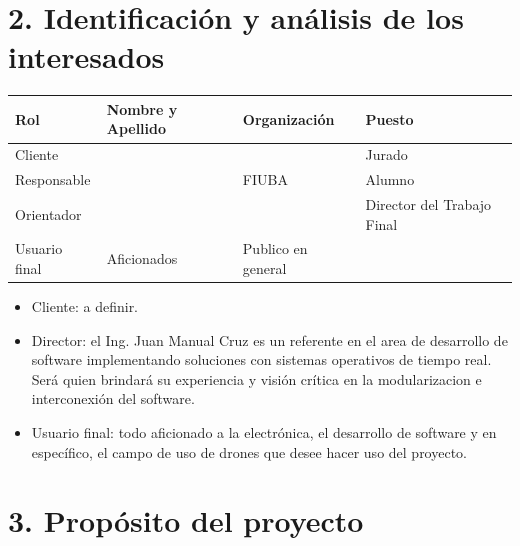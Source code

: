 \documentclass[
11pt, %
]{charter}
\begin{document}
	\vspace{25px}



\section{2. Identificación y análisis de los interesados}
\label{sec:interesados}



	\begin{table}[ht]
		\begin{tabularx}{\linewidth}{@{}|l|X|X|l|@{}}
			\hline
			\rowcolor[HTML]{C0C0C0}
			Rol           & Nombre y Apellido & Organización       & Puesto                     \\ \hline
			Cliente       & \clientename      & \empclientename    & Jurado                     \\ \hline
			Responsable   & \authorname       & FIUBA              & Alumno                     \\ \hline
			Orientador    & \supname          & \pertesupname      & Director del Trabajo Final \\ \hline
			Usuario final & Aficionados       & Publico en general &                            \\ \hline
		\end{tabularx}
	\end{table}

	\begin{itemize}
		\item Cliente: a definir.
		\item Director: el Ing. Juan Manual Cruz es un referente en el area de desarrollo de software implementando soluciones con sistemas operativos de tiempo real. Ser\'a quien brindar\'a su experiencia y visi\'on cr\'itica en la modularizacion e interconexi\'on del software.  
		\item Usuario final: todo aficionado a la electr\'onica, el desarrollo de software y en espec\'ifico, el campo de uso de drones que desee hacer uso del proyecto. 
		
	 \end{itemize}
		


\section{3. Propósito del proyecto}
\label{sec:proposito}
\end{document}
